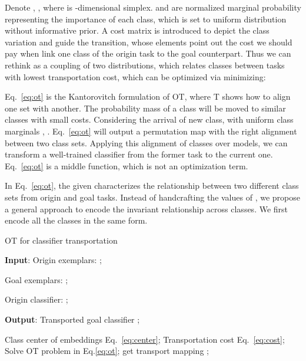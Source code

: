 \documentclass[sigconf]{acmart}
\begin{document}
 Denote , , where
 is -dimensional simplex. 
 and  are normalized marginal probability representing the importance of each class, which is set to uniform distribution without informative prior. 
A cost matrix  is introduced to depict the class variation and guide the transition, whose elements point out the cost we should pay when link one class of the origin task to the goal counterpart. Thus we can rethink  as a coupling of two distributions, which relates classes between tasks with lowest transportation cost, which can be optimized via minimizing:

Eq.~\ref{eq:ot} is the Kantorovitch formulation of OT, where T shows how to align one set with another. The probability mass of a class will be moved to similar classes with small costs. Considering the arrival of new class, with uniform class marginals , . Eq.~\ref{eq:ot} will output a permutation map  with the right alignment between two class sets.
Applying this alignment of classes over models, we can transform a well-trained classifier from the former task to the current one. Eq.~\ref{eq:ot} is a middle function, which is not an optimization term.


 In Eq.~\ref{eq:ot}, the given  characterizes the relationship between two different class sets from origin and goal tasks. Instead of handcrafting the values of , we propose a general approach to encode the invariant relationship across classes. We first encode all the classes in the same form.


{\begin{algorithm}[t]
		\caption{ OT for classifier transportation }	\label{alg:ot}
		\raggedright
		{\bf Input}: Origin exemplars: ; 
		
		Goal exemplars: ; 
		
		Origin classifier: ;
		
		{\bf Output}: Transported goal classifier ;
		
		\begin{algorithmic}[1]
			\State Class center of embeddings  Eq.~\ref{eq:center};
			\State Transportation cost   Eq.~\ref{eq:cost};
			\State Solve OT problem in Eq.\ref{eq:ot}; get transport mapping ;
			\State	\Return 
			\EndFunction
			
		\end{algorithmic}
		
\end{algorithm}}
\end{document}

